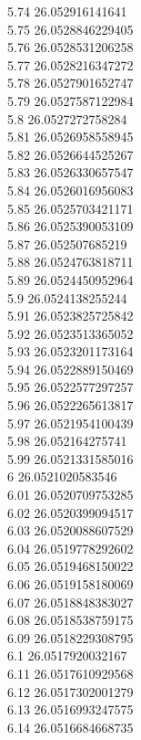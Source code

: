 {5.74	26.052916141641\\
5.75	26.0528846229405\\
5.76	26.0528531206258\\
5.77	26.0528216347272\\
5.78	26.0527901652747\\
5.79	26.0527587122984\\
5.8	26.0527272758284\\
5.81	26.0526958558945\\
5.82	26.0526644525267\\
5.83	26.0526330657547\\
5.84	26.0526016956083\\
5.85	26.0525703421171\\
5.86	26.0525390053109\\
5.87	26.052507685219\\
5.88	26.0524763818711\\
5.89	26.0524450952964\\
5.9	26.0524138255244\\
5.91	26.0523825725842\\
5.92	26.0523513365052\\
5.93	26.0523201173164\\
5.94	26.0522889150469\\
5.95	26.0522577297257\\
5.96	26.0522265613817\\
5.97	26.0521954100439\\
5.98	26.052164275741\\
5.99	26.0521331585016\\
6	26.0521020583546\\
6.01	26.0520709753285\\
6.02	26.0520399094517\\
6.03	26.0520088607529\\
6.04	26.0519778292602\\
6.05	26.0519468150022\\
6.06	26.0519158180069\\
6.07	26.0518848383027\\
6.08	26.0518538759175\\
6.09	26.0518229308795\\
6.1	26.0517920032167\\
6.11	26.0517610929568\\
6.12	26.0517302001279\\
6.13	26.0516993247575\\
6.14	26.0516684668735\\
}
